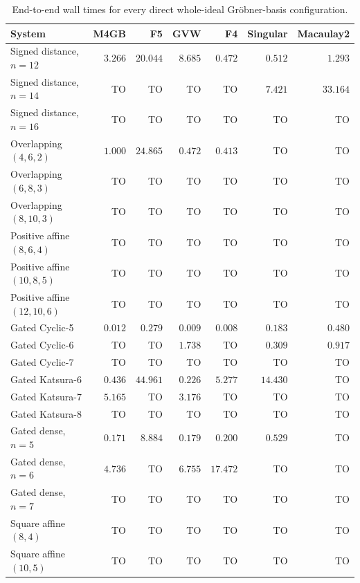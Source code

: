 \begin{table}[pos=htbp]
\centering
\caption{End-to-end wall times for every direct whole-ideal Gr\"obner-basis
configuration.}
\label{tab:appendix-direct}
\small
\setlength{\tabcolsep}{4pt}
\begin{tabular}{l r r r r r r}
\hline
System & M4GB & F5 & GVW & F4 & Singular & Macaulay2 \\
\hline
Signed distance, $n=12$ & $3.266$ & $20.044$ & $8.685$ & $0.472$ & $0.512$ & $1.293$ \\
Signed distance, $n=14$ & TO & TO & TO & TO & $7.421$ & $33.164$ \\
Signed distance, $n=16$ & TO & TO & TO & TO & TO & TO \\
Overlapping $(4,6,2)$ & $1.000$ & $24.865$ & $0.472$ & $0.413$ & TO & TO \\
Overlapping $(6,8,3)$ & TO & TO & TO & TO & TO & TO \\
Overlapping $(8,10,3)$ & TO & TO & TO & TO & TO & TO \\
Positive affine $(8,6,4)$ & TO & TO & TO & TO & TO & TO \\
Positive affine $(10,8,5)$ & TO & TO & TO & TO & TO & TO \\
Positive affine $(12,10,6)$ & TO & TO & TO & TO & TO & TO \\
Gated Cyclic-5 & $0.012$ & $0.279$ & $0.009$ & $0.008$ & $0.183$ & $0.480$ \\
Gated Cyclic-6 & TO & TO & $1.738$ & TO & $0.309$ & $0.917$ \\
Gated Cyclic-7 & TO & TO & TO & TO & TO & TO \\
Gated Katsura-6 & $0.436$ & $44.961$ & $0.226$ & $5.277$ & $14.430$ & TO \\
Gated Katsura-7 & $5.165$ & TO & $3.176$ & TO & TO & TO \\
Gated Katsura-8 & TO & TO & TO & TO & TO & TO \\
Gated dense, $n=5$ & $0.171$ & $8.884$ & $0.179$ & $0.200$ & $0.529$ & TO \\
Gated dense, $n=6$ & $4.736$ & TO & $6.755$ & $17.472$ & TO & TO \\
Gated dense, $n=7$ & TO & TO & TO & TO & TO & TO \\
Square affine $(8,4)$ & TO & TO & TO & TO & TO & TO \\
Square affine $(10,5)$ & TO & TO & TO & TO & TO & TO \\
\hline
\end{tabular}
\end{table}
\FloatBarrier

